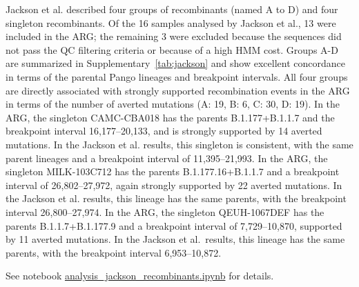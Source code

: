 \documentclass[12pt]{article}
\newcommand{\siref}[1]{Supplementary~\ref{#1}}
\begin{document}
Jackson et al. described
four groups of recombinants (named A to D) and four singleton recombinants.
Of the 16 samples analysed by Jackson et al., 13 were included in the ARG;
the remaining 3 were excluded
because the sequences did not pass the QC filtering criteria or
because of a high HMM cost.
Groups A-D are summarized in \siref{tab:jackson} and
show excellent concordance
in terms of the parental Pango lineages and breakpoint intervals.
All four groups are directly associated with
strongly supported recombination events in the ARG
in terms of the number of averted mutations (A: 19, B: 6, C: 30, D: 19).
In the ARG, the singleton CAMC-CBA018 has
the parents B.1.177+B.1.1.7 and
the breakpoint interval 16,177--20,133, and
is strongly supported by 14 averted mutations.
In the Jackson et al. results, this singleton is
consistent, with the same parent lineages and
a breakpoint interval of 11,395--21,993.
In the ARG, the singleton MILK-103C712 has
the parents B.1.177.16+B.1.1.7 and
a breakpoint interval of 26,802--27,972,
again strongly supported by 22 averted mutations.
In the Jackson et al. results,
this lineage has the same parents,
with the breakpoint interval 26,800--27,974.
In the ARG, the singleton QEUH-1067DEF has
the parents B.1.1.7+B.1.177.9 and
a breakpoint interval of 7,729--10,870,
supported by 11 averted mutations.
In the Jackson et al.\ results,
this lineage has the same parents,
with the breakpoint interval 6,953--10,872.

See notebook
\href{https://github.com/jeromekelleher/sc2ts-paper/blob/main/notebooks/analysis\_jackson\_recombinants.ipynb}
{analysis\_jackson\_recombinants.ipynb}
for details.
\end{document}
